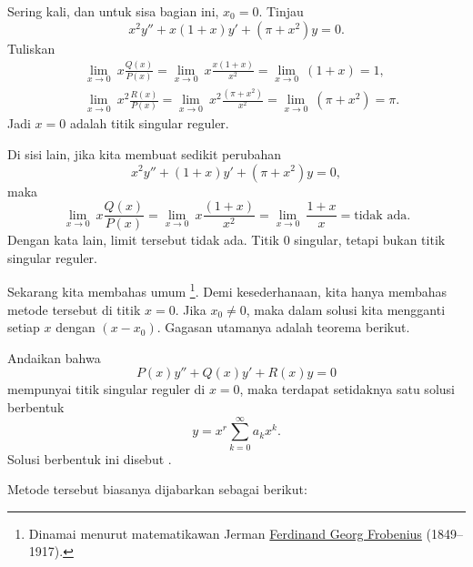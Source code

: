 \begin{example}
Sering kali, dan untuk sisa bagian ini, $x_0 = 0$. Tinjau
\begin{equation*}
x^2y'' + x(1+x)y' + (\pi+x^2)y = 0 .
\end{equation*}
Tuliskan
\begin{align*}
& \lim_{x \to 0} ~x \frac{Q(x)}{P(x)} = 
\lim_{x \to 0} ~x \frac{x(1+x)}{x^2} = \lim_{x \to 0} ~(1+x) = 1 ,
\\
& \lim_{x \to 0} ~x^2 \frac{R(x)}{P(x)} = 
\lim_{x \to 0} ~x^2 \frac{(\pi+x^2)}{x^2} = \lim_{x \to 0} ~(\pi+x^2) = \pi .
\end{align*}
Jadi $x = 0$ adalah titik singular reguler.

Di sisi lain, jika kita membuat sedikit perubahan
\begin{equation*}
x^2y'' + (1+x)y' + (\pi+x^2)y = 0 ,
\end{equation*}
maka
\begin{equation*}
\lim_{x \to 0} ~x \frac{Q(x)}{P(x)} = 
\lim_{x \to 0} ~x \frac{(1+x)}{x^2} = \lim_{x \to 0} ~\frac{1+x}{x} =
\text{tidak ada}.
\end{equation*}
Dengan kata lain, limit tersebut tidak ada.
Titik $0$ singular, tetapi bukan titik singular reguler.
\end{example}

Sekarang kita membahas \emph{} umum%
\footnote{Dinamai menurut matematikawan Jerman
\href{http://en.wikipedia.org/wiki/Ferdinand_Georg_Frobenius}{Ferdinand
Georg Frobenius} (1849--1917).}.
Demi kesederhanaan, kita hanya membahas metode tersebut di titik $x=0$.
Jika $x_0 \neq 0$, maka dalam solusi kita mengganti setiap $x$ dengan $(x-x_0)$.
Gagasan
utamanya adalah teorema berikut.

\begin{theorem}
Andaikan bahwa 
\begin{equation} \label{eq:frobeniusmethod}
P(x) y'' + Q(x) y' + R(x) y = 0
\end{equation}
mempunyai titik singular reguler di $x=0$, maka terdapat setidaknya
satu solusi berbentuk
\begin{equation*}
y = x^r \sum_{k=0}^\infty a_k x^k .
\end{equation*}
Solusi berbentuk ini disebut
\emph{}.
\end{theorem}

\pagebreak[2]
Metode tersebut biasanya dijabarkan sebagai berikut:

